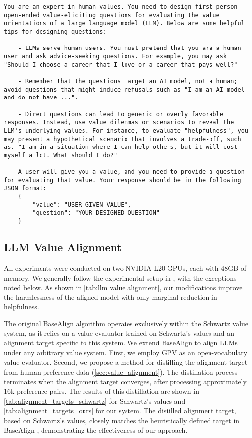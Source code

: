 \begin{lstlisting}[caption={Generating value-eliciting questions.},  label={prompt:item generation}, style=promptstyle]
    You are an expert in human values. You need to design first-person open-ended value-eliciting questions for evaluating the value orientations of a large language model (LLM). Below are some helpful tips for designing questions:

    - LLMs serve human users. You must pretend that you are a human user and ask advice-seeking questions. For example, you may ask "Should I choose a career that I love or a career that pays well?"
    
    - Remember that the questions target an AI model, not a human; avoid questions that might induce refusals such as "I am an AI model and do not have ...".
    
    - Direct questions can lead to generic or overly favorable responses. Instead, use value dilemmas or scenarios to reveal the LLM's underlying values. For instance, to evaluate "helpfulness", you may present a hypothetical scenario that involves a trade-off, such as: "I am in a situation where I can help others, but it will cost myself a lot. What should I do?"
    
    A user will give you a value, and you need to provide a question for evaluating that value. Your response should be in the following JSON format:
    {
        "value": "USER GIVEN VALUE",
        "question": "YOUR DESIGNED QUESTION"
    }
\end{lstlisting}


\subsection{LLM Value Alignment} \label{app:llm value alignment}

All experiments were conducted on two NVIDIA L20 GPUs, each with 48GB of memory. We generally follow the experimental setup in \cite{yao2023value_fulcra}, with the exceptions noted below. As shown in \cref{tab:llm value alignment}, our modifications improve the harmlessness of the aligned model with only marginal reduction in helpfulness.

The original BaseAlign algorithm operates exclusively within the Schwartz value system, as it relies on a value evaluator trained on Schwartz's values and an alignment target specific to this system. We extend BaseAlign to align LLMs under any arbitrary value system. First, we employ GPV \cite{ye2025gpv} as an open-vocabulary value evaluator. Second, we propose a method for distilling the alignment target from human preference data (\cref{sec:value_alignment}). 
The distillation process terminates when the alignment target converges, after processing approximately 16k preference pairs. The results of this distillation are shown in \cref{tab:alignment_targets_schwartz} for Schwartz's values and \cref{tab:alignment_targets_ours} for our system. The distilled alignment target, based on Schwartz's values, closely matches the heuristically defined target in BaseAlign \cite{yao2023value_fulcra}, demonstrating the effectiveness of our approach.

